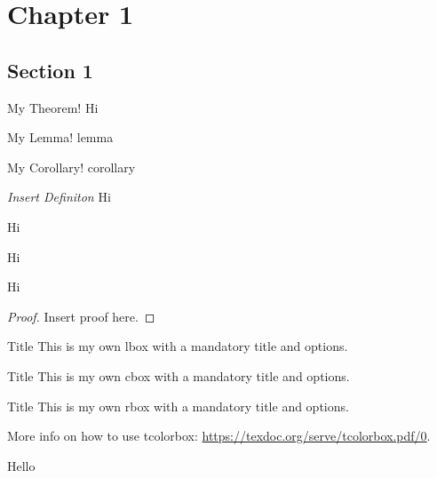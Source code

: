\documentclass[oneside]{book}
\begin{document}


\raggedright

\chapter{Chapter 1}
\section{Section 1}
\begin{theorem}{My Theorem!}{}
    Hi
\end{theorem}
\begin{lemma}{My Lemma!}{}
    lemma
\end{lemma}
\begin{corollary}{My Corollary!}{}
    corollary
\end{corollary}
\begin{definition}{\textit{Insert Definiton}}{}
    Hi
\end{definition}
\begin{note}
    Hi
\end{note}
\begin{fact}
    Hi
\end{fact}
\begin{Qns}
    Hi
\end{Qns}
\begin{proof}
    Insert proof here.
\end{proof}
\begin{lbox}[colback=white]{Title}
    This is my own lbox with a mandatory title
    and options.
\end{lbox}
\begin{cbox}[colback=white]{Title}
    This is my own cbox with a mandatory title
    and options.
\end{cbox}
\begin{rbox}[colback=white]{Title}
    This is my own rbox with a mandatory title
    and options.
\end{rbox}
More info on how to use tcolorbox: \url{https://texdoc.org/serve/tcolorbox.pdf/0}.

\newpage 
Hello
\end{document}

